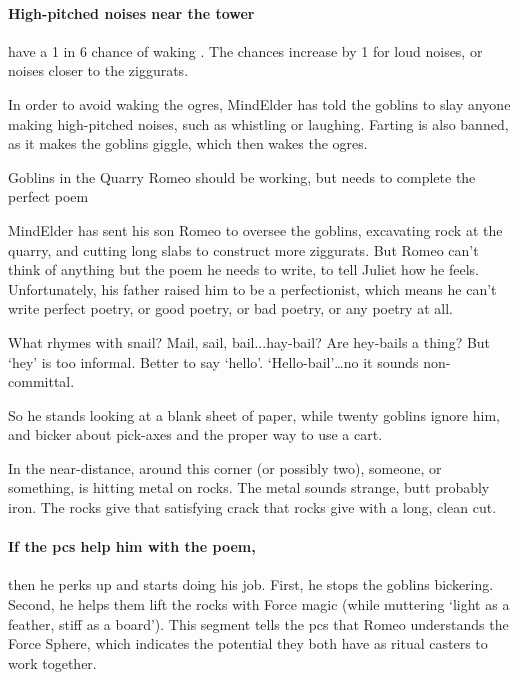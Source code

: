 \paragraph{High-pitched noises near the tower}
have a 1 in 6 chance of waking .
The chances increase by 1 for loud noises, or noises closer to the ziggurats.

In order to avoid waking the ogres, \gls{MindElder} has told the goblins to slay anyone making high-pitched noises, such as whistling or laughing.
Farting is also banned, as it makes the goblins giggle, which then wakes the ogres.

{Goblins in the Quarry}%
{Romeo should be working, but needs to complete the perfect poem}%


\Gls{MindElder} has sent his son Romeo to oversee the goblins, excavating rock at the quarry, and cutting long slabs to construct more ziggurats.
But Romeo can't think of anything but the poem he needs to write, to tell Juliet how he feels.
Unfortunately, his father raised him to be a perfectionist, which means he can't write perfect poetry, or good poetry, or bad poetry, or any poetry at all.

\begin{speechtext}
  What rhymes with snail?
  Mail, sail, bail...hay-bail?
  Are hey-bails a thing?
  But `hey' is too informal.
  Better to say `hello'.
  `Hello-bail'\ldots no it sounds non-committal.
\end{speechtext}

So he stands looking at a blank sheet of paper, while twenty goblins ignore him, and bicker about pick-axes and the proper way to use a cart.

\begin{boxtext}
  In the near-distance, around this corner (or possibly two), someone, or something, is hitting metal on rocks.
  The metal sounds strange, butt probably iron.
  The rocks give that satisfying crack that rocks give with a long, clean cut.
\end{boxtext}

\paragraph{If the \glspl{pc} help him with the poem,}
then he perks up and starts doing his job.
First, he stops the goblins bickering.
Second, he helps them lift the rocks with Force magic (while muttering `light as a feather, stiff as a board').
This \gls{segment} tells the \glspl{pc} that Romeo understands the Force Sphere, which indicates the potential they both have as ritual casters to work together.

